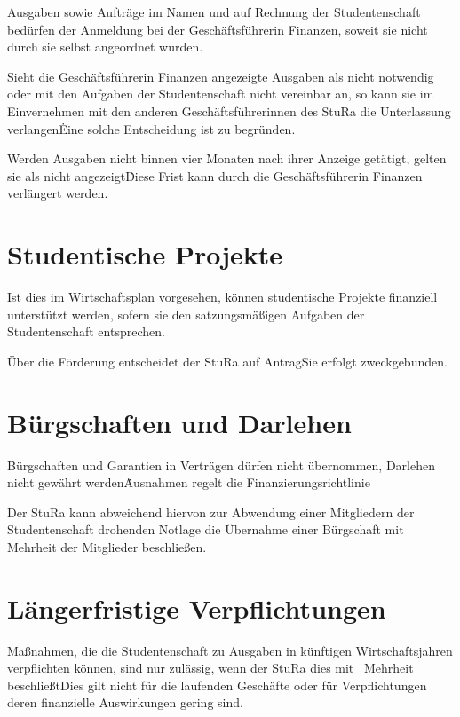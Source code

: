 \Abs \Satz Ausgaben sowie Aufträge im Namen und auf Rechnung der Studentenschaft bedürfen der Anmeldung bei der Geschäftsführerin Finanzen, soweit sie nicht durch sie selbst angeordnet wurden.

\Abs \Satz Sieht die Geschäftsführerin Finanzen angezeigte Ausgaben als nicht notwendig oder mit den Aufgaben der Studentenschaft nicht vereinbar an, so kann sie im Einvernehmen mit den anderen Geschäftsführerinnen des StuRa die Unterlassung verlangen\. Eine solche Entscheidung ist zu begründen.

\Abs \Satz Werden Ausgaben nicht binnen vier Monaten nach ihrer Anzeige getätigt, gelten sie als nicht angezeigt\. Diese Frist kann durch die Geschäftsführerin Finanzen verlängert werden.



\section{Studentische Projekte}

\Abs \Satz Ist dies im Wirtschaftsplan vorgesehen, können studentische Projekte finanziell unterstützt werden, sofern sie den satzungsmäßigen Aufgaben der Studentenschaft entsprechen.

\Abs \Satz Über die Förderung entscheidet der StuRa auf Antrag\. Sie erfolgt zweckgebunden.



\section{Bürgschaften und Darlehen}

\Abs \Satz Bürgschaften und Garantien in Verträgen dürfen nicht übernommen, Darlehen nicht gewährt werden\. Ausnahmen regelt die Finanzierungsrichtlinie

\Abs \Satz Der StuRa kann abweichend hiervon zur Abwendung einer Mitgliedern der Studentenschaft drohenden Notlage die Übernahme einer Bürgschaft mit Mehrheit der Mitglieder beschließen.



\section{Längerfristige Verpflichtungen}

\Abs \Satz Maßnahmen, die die Studentenschaft zu Ausgaben in künftigen Wirtschaftsjahren verpflichten können, sind nur zulässig, wenn der StuRa dies mit ~Mehrheit beschließt\. Dies gilt nicht für die laufenden Geschäfte oder für Verpflichtungen deren finanzielle Auswirkungen gering sind.



